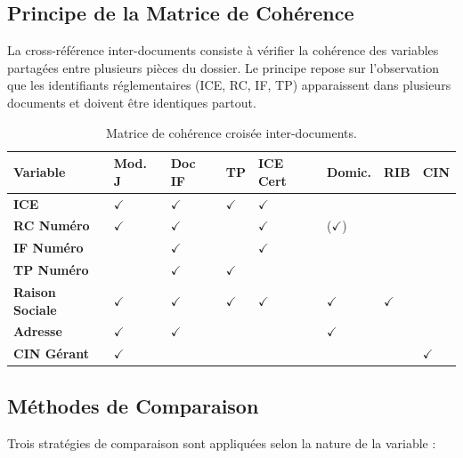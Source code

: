 \subsection{Principe de la Matrice de Coh\'{e}rence}

La cross-r\'{e}f\'{e}rence inter-documents consiste \`{a} v\'{e}rifier la coh\'{e}rence des variables partag\'{e}es entre plusieurs pi\`{e}ces du dossier. Le principe repose sur l'observation que les identifiants r\'{e}glementaires (ICE, RC, IF, TP) apparaissent dans plusieurs documents et doivent \^{e}tre identiques partout.

\begin{table}[H]
\centering
\footnotesize
\setlength{\tabcolsep}{3pt}
\begin{tabularx}{\textwidth}{@{}>{\bfseries}p{2.8cm} >{\centering\arraybackslash}p{1.2cm} >{\centering\arraybackslash}p{1.2cm} >{\centering\arraybackslash}p{1.2cm} >{\centering\arraybackslash}p{1.2cm} >{\centering\arraybackslash}p{1.2cm} >{\centering\arraybackslash}p{1.2cm} >{\centering\arraybackslash}p{1.2cm}@{}}
\toprule
\rowcolor{lightblue}
Variable & Mod. J & Doc IF & TP & ICE Cert & Domic. & RIB & CIN \\
\midrule
ICE & $\checkmark$ & $\checkmark$ & $\checkmark$ & $\checkmark$ & & & \\
RC Num\'{e}ro & $\checkmark$ & $\checkmark$ & & $\checkmark$ & ($\checkmark$) & & \\
IF Num\'{e}ro & & $\checkmark$ & & $\checkmark$ & & & \\
TP Num\'{e}ro & & $\checkmark$ & $\checkmark$ & & & & \\
Raison Sociale & $\checkmark$ & $\checkmark$ & $\checkmark$ & $\checkmark$ & $\checkmark$ & $\checkmark$ & \\
Adresse & $\checkmark$ & $\checkmark$ & & & $\checkmark$ & & \\
CIN G\'{e}rant & $\checkmark$ & & & & & & $\checkmark$ \\
\bottomrule
\end{tabularx}
\caption{Matrice de coh\'{e}rence crois\'{e}e inter-documents.}
\label{tab:matrice-coherence}
\end{table}

\subsection{M\'{e}thodes de Comparaison}

Trois strat\'{e}gies de comparaison sont appliqu\'{e}es selon la nature de la variable :

